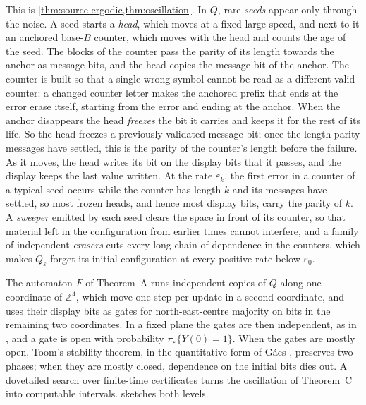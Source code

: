 \documentclass[11pt]{article}
\theoremstyle{plain}
\theoremstyle{definition}
\theoremstyle{remark}
\newcommand{\Z}{\mathbb Z}
\newcommand{\eps}{\varepsilon}
\begin{document}
This is \cref{thm:source-ergodic,thm:oscillation}. In $Q$, rare \emph{seeds} appear only through the noise. A seed starts a \emph{head}, which moves at a fixed large speed, and next to it an anchored base-$B$ counter, which moves with the head and counts the age of the seed. The blocks of the counter pass the parity of its length towards the anchor as message bits, and the head copies the message bit of the anchor. The counter is built so that a single wrong symbol cannot be read as a different valid counter: a changed counter letter makes the anchored prefix that ends at the error erase itself, starting from the error and ending at the anchor. When the anchor disappears the head \emph{freezes} the bit it carries and keeps it for the rest of its life. So the head freezes a previously validated message bit; once the length-parity messages have settled, this is the parity of the counter's length before the failure. As it moves, the head writes its bit on the display bits that it passes, and the display keeps the last value written. At the rate $\eps_k$, the first error in a counter of a typical seed occurs while the counter has length $k$ and its messages have settled, so most frozen heads, and hence most display bits, carry the parity of $k$. A \emph{sweeper} emitted by each seed clears the space in front of its counter, so that material left in the configuration from earlier times cannot interfere, and a family of independent \emph{erasers} cuts every long chain of dependence in the counters, which makes $Q_\eps$ forget its initial configuration at every positive rate below $\eps_0$.

The automaton $F$ of Theorem~A runs independent copies of $Q$ along one coordinate of $\Z^4$, which move one step per update in a second coordinate, and uses their display bits as gates for north-east-centre majority on bits in the remaining two coordinates. In a fixed plane the gates are then independent, as in \cite{DMnil}, and a gate is open with probability $\pi_\eps\{Y(0)=1\}$. When the gates are mostly open, Toom's stability theorem, in the quantitative form of G\'acs \cite{Gacs21}, preserves two phases; when they are mostly closed, dependence on the initial bits dies out. A dovetailed search over finite-time certificates turns the oscillation of Theorem~C into computable intervals.  sketches both levels.
\end{document}
